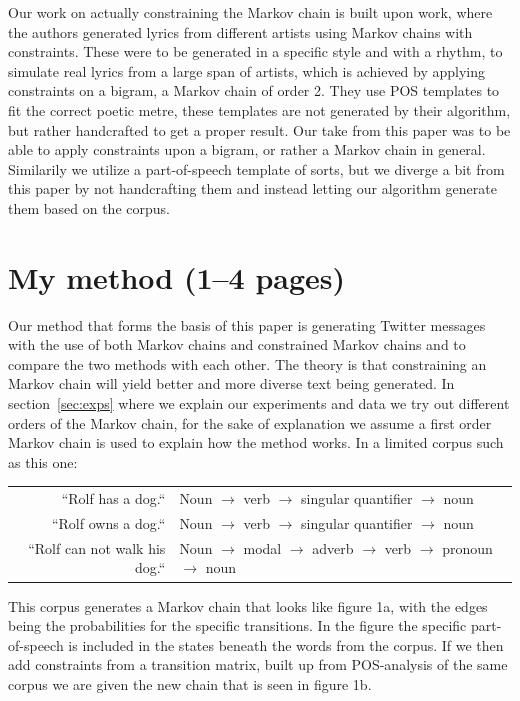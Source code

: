 \documentclass[a4paper,12pt]{article}
\begin{document}
Our work on actually constraining the Markov chain is built upon \cite{McBarb} work, 
where the authors generated lyrics from different artists using Markov chains with constraints. 
These were to be generated in a specific style and with a rhythm, to simulate real lyrics from a large span of artists, which is achieved by applying constraints on a bigram, a Markov chain of order 2.
They use POS templates to fit the correct poetic metre, these templates are not generated by their algorithm, but rather handcrafted to get a proper result.
Our take from this paper was to be able to apply constraints upon a bigram, or rather a Markov chain in general. Similarily we utilize a part-of-speech template of sorts, but we diverge a bit from this paper by not handcrafting them and instead letting our algorithm generate them based on the corpus.


\newpage

\section{My method (1--4 pages)}
\label{sec:method}
Our method that forms the basis of this paper is generating Twitter messages with the use of both Markov chains and constrained Markov chains and to compare the two methods with each other.
The theory is that constraining an Markov chain will yield better and more diverse text being generated. 
In section~\ref{sec:exps} where we explain our experiments and data we try out different orders of the Markov chain, 
for the sake of explanation we assume a first order Markov chain is used to explain how the method works. 
In a limited corpus such as this one: \\

\begin{tabular}{r | l}
``Rolf has a dog.`` & Noun $\to$ verb $\to$ singular quantifier $\to$ noun \\
``Rolf owns a dog.`` & Noun $\to$ verb $\to$ singular quantifier $\to$ noun \\
``Rolf can not walk his dog.`` & Noun $\to$ modal $\to$ adverb $\to$ verb $\to$ pronoun $\to$ noun \\
\end{tabular}

This corpus generates a Markov chain that looks like figure 1a, with the edges being the probabilities for the specific transitions. 
In the figure the specific part-of-speech is included in the states beneath the words from the corpus. 
If we then add constraints from a transition matrix, built up from POS-analysis of the same corpus we are given the new chain that is seen in figure 1b.
\end{document}
